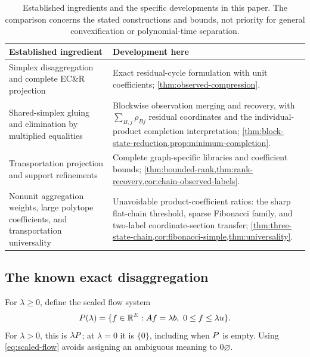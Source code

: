 \begin{table}[tb]\centering\small
\caption{Established ingredients and the specific developments in this paper.
The comparison concerns the stated constructions and bounds, not priority
for general convexification or polynomial-time separation.}
\label{tab:prior-comparison}
\begin{tabular}{>{\raggedright\arraybackslash}p{.43\linewidth}
                >{\raggedright\arraybackslash}p{.49\linewidth}}\toprule
Established ingredient & Development here\\\midrule
Simplex disaggregation and complete EC\&R projection
\citep{DavarniaRichardTawarmalani2017,KhademniaDavarnia2025}
& Exact residual-cycle formulation with unit coefficients;
\cref{thm:observed-compression}.\\[4pt]
Shared-simplex gluing and elimination by multiplied equalities
\citep{Davarnia2016,LibertiPantelides2006}
& Blockwise observation merging and recovery, with
$\sum_{B,j}\rho_{Bj}$ residual coordinates and the individual-product
completion interpretation; \cref{thm:block-state-reduction,prop:minimum-completion}.\\[4pt]
Transportation projection and support refinements
\citep{KisHorvath2022,GritzmannSturmfels1993,OnnRothblum2004}
& Complete graph-specific libraries and coefficient bounds;
\cref{thm:bounded-rank,thm:rank-recovery,cor:chain-observed-labels}.\\[4pt]
Nonunit aggregation weights, large polytope coefficients,
and transportation universality
\citep{KhademniaDavarnia2025,AlonVu1997,DeLoeraOnn2006}
& Unavoidable product-coefficient ratios: the sharp flat-chain threshold,
sparse Fibonacci family, and two-label coordinate-section transfer;
\cref{thm:three-state-chain,cor:fibonacci-simple,thm:universality}.\\\bottomrule
\end{tabular}
\end{table}

\subsection{The known exact disaggregation}\label{subsec:disaggregation}
For $\lambda\ge0$, define the scaled flow system
\begin{equation}\label{eq:scaled-flow}
 P(\lambda)=\{f\in\mathbb R^E:Af=\lambda b,\ 0\le f\le\lambda u\}.
\end{equation}
For $\lambda>0$, this is $\lambda P$; at $\lambda=0$ it is $\{0\}$,
including when $P$ is empty. Using \eqref{eq:scaled-flow} avoids assigning
an ambiguous meaning to $0\varnothing$.

